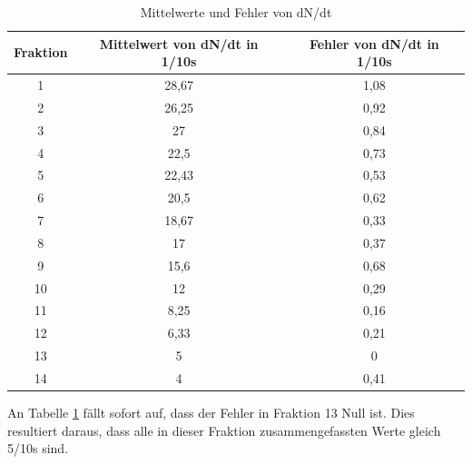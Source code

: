 \begin{table}
\centering
\begin{tabular}{ccc}

Fraktion	&Mittelwert von dN/dt in 1/10s	&Fehler von dN/dt in 1/10s \\
\toprule
1		&28,67				&1,08\\

2		&26,25				&0,92\\

3		&27					&0,84\\

4		&22,5				&0,73\\

5		&22,43				&0,53\\

6		&20,5				&0,62\\

7		&18,67				&0,33\\

8		&17					&0,37\\

9		&15,6				&0,68\\

10		&12					&0,29\\

11		&8,25				&0,16\\

12		&6,33				&0,21\\

13		&5					&0\\

14		&4					&0,41\\

\end{tabular}
\caption{Mittelwerte und Fehler von dN/dt}
\label{tbl_3}
\end{table}


An Tabelle \ref{tbl_3} fällt sofort auf, dass der Fehler in Fraktion 13 Null ist. Dies resultiert daraus, dass alle in dieser Fraktion zusammengefassten Werte gleich 5/10s sind.


